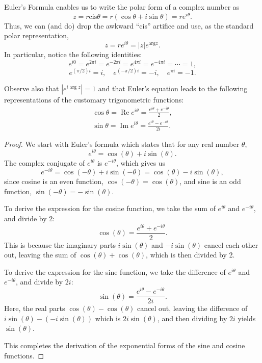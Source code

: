 Euler's Formula enables us to write the polar form of a complex number as
\[
z = r \text{cis} \theta = r(\cos \theta + i \sin \theta) = r e^{i\theta}.
\]
Thus, we can (and do) drop the awkward ``cis'' artifice and use, as the standard polar representation,
\[
z = r e^{i\theta} = \lvert z \rvert e^{\text{arg} z}.
\]
In particular, notice the following identities:
\[
e^{i0} = e^{2\pi i} = e^{-2\pi i} = e^{4\pi i} = e^{-4\pi i} = \cdots = 1,
\]
\[
e^{(\pi/2)i} = i, \quad e^{(-\pi/2)i} = -i, \quad e^{\pi i} = -1.
\]

Observe also that  $\left|e^{i \arg z}\right|=1$  and that Euler's equation leads to the following representations of the customary trigonometric functions:
$$\begin{array}{l}
    \cos \theta=\operatorname{Re} e^{i \theta}=\frac{e^{i \theta}+e^{-i \theta}}{2}, \\
    \sin \theta=\operatorname{Im} e^{i \theta}=\frac{e^{i \theta}-e^{-i \theta}}{2 i} .
    \end{array}$$

\begin{proof}
    We start with Euler's formula which states that for any real number \( \theta \),
\begin{equation}
    e^{i\theta} = \cos(\theta) + i\sin(\theta).
\end{equation}
The complex conjugate of \( e^{i\theta} \) is \( e^{-i\theta} \), which gives us
\begin{equation}
    e^{-i\theta} = \cos(-\theta) + i\sin(-\theta) = \cos(\theta) - i\sin(\theta),
\end{equation}
since cosine is an even function, \( \cos(-\theta) = \cos(\theta) \), and sine is an odd function, \( \sin(-\theta) = -\sin(\theta) \).

To derive the expression for the cosine function, we take the sum of \( e^{i\theta} \) and \( e^{-i\theta} \), and divide by 2:
\begin{equation}
    \cos(\theta) = \frac{e^{i\theta} + e^{-i\theta}}{2}.
\end{equation}
This is because the imaginary parts \( i\sin(\theta) \) and \( -i\sin(\theta) \) cancel each other out, leaving the sum of \( \cos(\theta) + \cos(\theta) \), which is then divided by 2.

To derive the expression for the sine function, we take the difference of \( e^{i\theta} \) and \( e^{-i\theta} \), and divide by \( 2i \):
\begin{equation}
    \sin(\theta) = \frac{e^{i\theta} - e^{-i\theta}}{2i}.
\end{equation}
Here, the real parts \( \cos(\theta) - \cos(\theta) \) cancel out, leaving the difference of \( i\sin(\theta) - (-i\sin(\theta)) \) which is \( 2i\sin(\theta) \), and then dividing by \( 2i \) yields \( \sin(\theta) \).

This completes the derivation of the exponential forms of the sine and cosine functions.
\end{proof}

